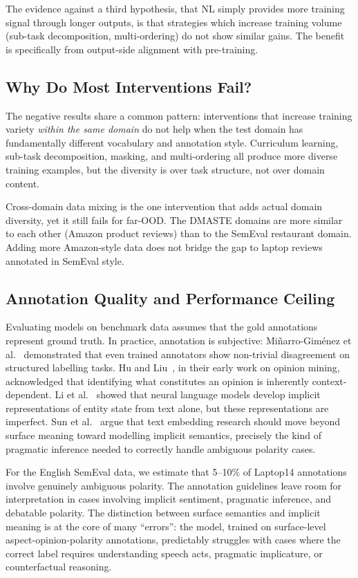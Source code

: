 \documentclass[12pt,a4paper]{report}
\begin{document}
The evidence against a third hypothesis, that NL simply provides more training signal through longer outputs, is that strategies which increase training volume (sub-task decomposition, multi-ordering) do not show similar gains. The benefit is specifically from output-side alignment with pre-training.

\subsection{Why Do Most Interventions Fail?}

The negative results share a common pattern: interventions that increase training variety \textit{within the same domain} do not help when the test domain has fundamentally different vocabulary and annotation style. Curriculum learning, sub-task decomposition, masking, and multi-ordering all produce more diverse training examples, but the diversity is over task structure, not over domain content.

Cross-domain data mixing is the one intervention that adds actual domain diversity, yet it still fails for far-OOD. The DMASTE domains are more similar to each other (Amazon product reviews) than to the SemEval restaurant domain. Adding more Amazon-style data does not bridge the gap to laptop reviews annotated in SemEval style.

\subsection{Annotation Quality and Performance Ceiling}

Evaluating models on benchmark data assumes that the gold annotations represent ground truth. In practice, annotation is subjective: Miñarro-Giménez et al.~\cite{minarro2019quantitative} demonstrated that even trained annotators show non-trivial disagreement on structured labelling tasks. Hu and Liu~\cite{hu2004mining}, in their early work on opinion mining, acknowledged that identifying what constitutes an opinion is inherently context-dependent. Li et al.~\cite{li2021implicit} showed that neural language models develop implicit representations of entity state from text alone, but these representations are imperfect. Sun et al.~\cite{sun2025implicit} argue that text embedding research should move beyond surface meaning toward modelling implicit semantics, precisely the kind of pragmatic inference needed to correctly handle ambiguous polarity cases.

For the English SemEval data, we estimate that 5--10\% of Laptop14 annotations involve genuinely ambiguous polarity. The annotation guidelines leave room for interpretation in cases involving implicit sentiment, pragmatic inference, and debatable polarity. The distinction between surface semantics and implicit meaning is at the core of many ``errors'': the model, trained on surface-level aspect-opinion-polarity annotations, predictably struggles with cases where the correct label requires understanding speech acts, pragmatic implicature, or counterfactual reasoning.
\end{document}
